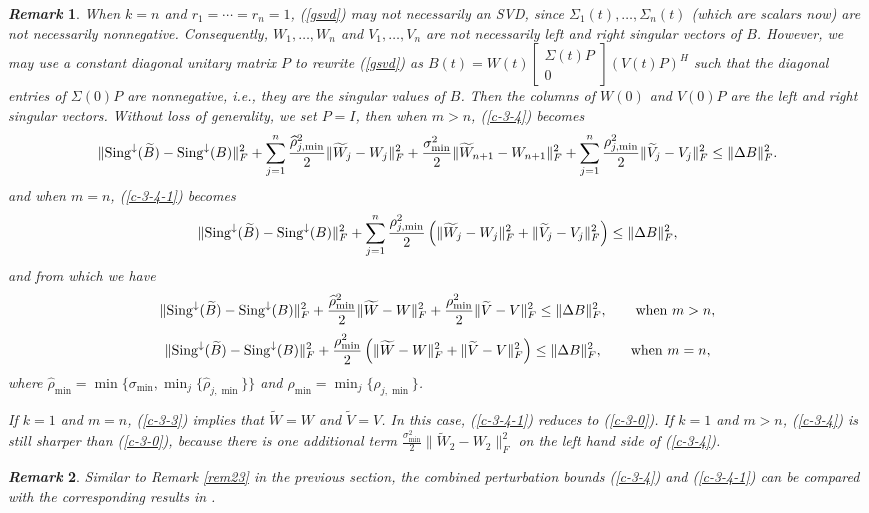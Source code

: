 \documentclass[11pt,a4paper]{article}
\numberwithin{equation}{section}
\newcommand {\mat} [1] {\left[\begin{array}{#1}}
\newcommand {\rix}     {\end{array}\right]}
\newtheorem{Remark}{{\it Remark}}[section]
\newcommand {\wh} {\widehat}
\newcommand {\wt} {\widetilde}
\begin{document}
\begin{Remark}\label{lem321}
When $k=n$ and $r_1=\cdots=r_n=1$, (\ref{gsvd}) may not necessarily an SVD, since
$\Sigma_1(t),\ldots,\Sigma_n(t)$ (which are scalars now) are not necessarily nonnegative.
Consequently, $W_1,\ldots,W_n$ and $V_1,\ldots,V_n$ are not necessarily
 left and right singular vectors of $B$. However, we may use a constant diagonal unitary
 matrix $P$ to rewrite (\ref{gsvd}) as $B(t)=W(t)\mat{c}\Sigma(t)P\\0\rix (V(t)P)^H$
 such that the diagonal entries of $\Sigma(0)P$ are nonnegative, i.e., they are the
 singular values of $B$. Then the columns of $W(0)$ and $V(0)P$ are the left and right
 singular vectors. Without loss of generality, we set $P=I$, then when $m>n$,
  (\ref{c-3-4}) becomes
 {\footnotesize\[
\|{{\rm Sing}^{\downarrow}(\wt B)-{\rm Sing}^{\downarrow}(B)}\|_F^2
+\sum_{j=1}^{n}\frac{\wh\rho_{j,\min}^2}2\|{\wt W_j-W_j}\|_F^2
+\frac{\sigma_{\min}^2}2\|{\wt W_{n+1}-W_{n+1}}\|_F^2
+\sum_{j=1}^n\frac{\rho_{j,\min}^2}2\|{\wt V_j-V_j}\|_F^2
\leq\|{\Delta B}\|_F^2.
\]}
 and when $m=n$, (\ref{c-3-4-1}) becomes
 \[
 \|{{\rm Sing}^{\downarrow}(\wt B)-{\rm Sing}^{\downarrow}(B)}\|_F^2
+\sum_{j=1}^{n}\frac{\rho_{j,\min}^2}2\left(\|{\wt W_j-W_j}\|_F^2+\|{\wt V_j-V_j}\|_F^2\right)
\leq\|{\Delta B}\|_F^2,
\]
and from which we have
 \[
\|{{\rm Sing}^{\downarrow}(\wt B)-{\rm Sing}^{\downarrow}(B)}\|_F^2
+\frac{\wh\rho_{\min}^2}2\|{\wt W-W}\|_F^2
+\frac{\rho_{\min}^2}2\|{\wt V-V}\|_F^2
\leq\|{\Delta B}\|_F^2,\qquad \mbox{when }m>n,
\]
 \[
 \|{{\rm Sing}^{\downarrow}(\wt B)-{\rm Sing}^{\downarrow}(B)}\|_F^2
+\frac{\rho_{\min}^2}2\left(\|{\wt W-W}\|_F^2+\|{\wt V-V}\|_F^2\right)
\leq\|{\Delta B}\|_F^2,\qquad \mbox{when }m=n,
\]
where $\wh\rho_{\min}=\min\{\sigma_{\min},\min_j\{\wh\rho_{j,\min}\}\}$ and
$\rho_{\min}=\min_j\{\rho_{j,\min}\}$.


If $k=1$ and $m=n$, (\ref{c-3-3}) implies that $\wt W=W$ and $\wt V=V$. In this case, (\ref{c-3-4-1}) reduces to (\ref{c-3-0}). If $k=1$ and $m>n$, (\ref{c-3-4}) is still sharper
than (\ref{c-3-0}), because there is one additional term $\frac{\sigma_{\min}^2}2\|\wt W_2-W_2\|_F^2$
on the left hand side of (\ref{c-3-4}).
\end{Remark}

\medskip

\begin{Remark}\label{rem331}
Similar to Remark \ref{rem23} in the previous section, the combined perturbation bounds (\ref{c-3-4}) and (\ref{c-3-4-1}) can be compared
with the corresponding results in \cite{li07}.
\end{Remark}\vskip 2mm
\end{document}

